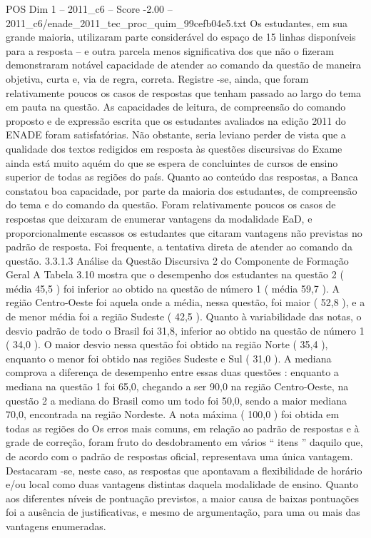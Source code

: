 \begin{textsample}{POS Dim 1 – 2011\_c6 – Score -2.00 – 2011\_c6/enade\_2011\_tec\_proc\_quim\_99cefb04e5.txt}
Os estudantes, em sua grande maioria, utilizaram parte considerável do espaço de 15 linhas disponíveis para a resposta – e outra parcela menos significativa dos que não o fizeram demonstraram notável capacidade de atender ao comando da questão de maneira objetiva, curta e, via de regra, correta.
Registre -se, ainda, que foram relativamente poucos os casos de respostas que tenham passado ao largo do tema em pauta na questão.
As capacidades de leitura, de compreensão do comando proposto e de expressão escrita que os estudantes avaliados na edição 2011 do ENADE foram satisfatórias.
Não obstante, seria leviano perder de vista que a qualidade dos textos redigidos em resposta às questões discursivas do Exame ainda está muito aquém do que se espera de concluintes de cursos de ensino superior de todas as regiões do país.
Quanto ao conteúdo das respostas, a Banca constatou boa capacidade, por parte da maioria dos estudantes, de compreensão do tema e do comando da questão.
Foram relativamente poucos os casos de respostas que deixaram de enumerar vantagens da modalidade EaD, e proporcionalmente escassos os estudantes que citaram vantagens não previstas no padrão de resposta.
Foi frequente, a tentativa direta de atender ao comando da questão. 3.3.1.3 Análise da Questão Discursiva 2 do Componente de Formação Geral A Tabela 3.10 mostra que o desempenho dos estudantes na questão 2 ( média 45,5 ) foi inferior ao obtido na questão de número 1 ( média 59,7 ).
A região Centro-Oeste foi aquela onde a média, nessa questão, foi maior ( 52,8 ), e a de menor média foi a região Sudeste ( 42,5 ).
Quanto à variabilidade das notas, o desvio padrão de todo o Brasil foi 31,8, inferior ao obtido na questão de número 1 ( 34,0 ).
O maior desvio nessa questão foi obtido na região Norte ( 35,4 ), enquanto o menor foi obtido nas regiões Sudeste e Sul ( 31,0 ).
A mediana comprova a diferença de desempenho entre essas duas questões : enquanto a mediana na questão 1 foi 65,0, chegando a ser 90,0 na região Centro-Oeste, na questão 2 a mediana do Brasil como um todo foi 50,0, sendo a maior mediana 70,0, encontrada na região Nordeste.
A nota máxima ( 100,0 ) foi obtida em todas as regiões do Os erros mais comuns, em relação ao padrão de respostas e à grade de correção, foram fruto do desdobramento em vários “ itens ” daquilo que, de acordo com o padrão de respostas oficial, representava uma única vantagem.
Destacaram -se, neste caso, as respostas que apontavam a flexibilidade de horário e/ou local como duas vantagens distintas daquela modalidade de ensino.
Quanto aos diferentes níveis de pontuação previstos, a maior causa de baixas pontuações foi a ausência de justificativas, e mesmo de argumentação, para uma ou mais das vantagens enumeradas.

\end{textsample}
